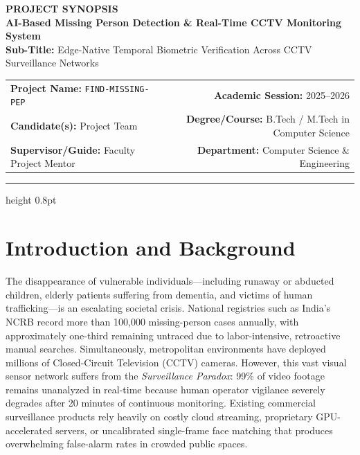 \documentclass[10pt, a4paper]{article}
\begin{document}
\begin{center}
    {\large \textbf{PROJECT SYNOPSIS}}\\[2pt]
    {\Large \textbf{\textcolor{navyblue}{AI-Based Missing Person Detection \& Real-Time CCTV Monitoring System}}}\\[2pt]
    {\normalsize \textbf{Sub-Title:} Edge-Native Temporal Biometric Verification Across CCTV Surveillance Networks}\\[4pt]
    
    \begin{tabularx}{\textwidth}{@{}X r@{}}
        \textbf{Project Name:} \texttt{FIND-MISSING-PEP} & \textbf{Academic Session:} 2025--2026 \\
        \textbf{Candidate(s):} Project Team & \textbf{Degree/Course:} B.Tech / M.Tech in Computer Science \\
        \textbf{Supervisor/Guide:} Faculty Project Mentor & \textbf{Department:} Computer Science \& Engineering
    \end{tabularx}
\end{center}
\vspace{-6pt}
\hrule height 0.8pt
\vspace{4pt}


\section{Introduction and Background}
The disappearance of vulnerable individuals---including runaway or abducted children, elderly patients suffering from dementia, and victims of human trafficking---is an escalating societal crisis. National registries such as India's NCRB record more than 100,000 missing-person cases annually, with approximately one-third remaining untraced due to labor-intensive, retroactive manual searches. Simultaneously, metropolitan environments have deployed millions of Closed-Circuit Television (CCTV) cameras. However, this vast visual sensor network suffers from the \textit{Surveillance Paradox}: 99\% of video footage remains unanalyzed in real-time because human operator vigilance severely degrades after 20 minutes of continuous monitoring. Existing commercial surveillance products rely heavily on costly cloud streaming, proprietary GPU-accelerated servers, or uncalibrated single-frame face matching that produces overwhelming false-alarm rates in crowded public spaces. 
\end{document}
